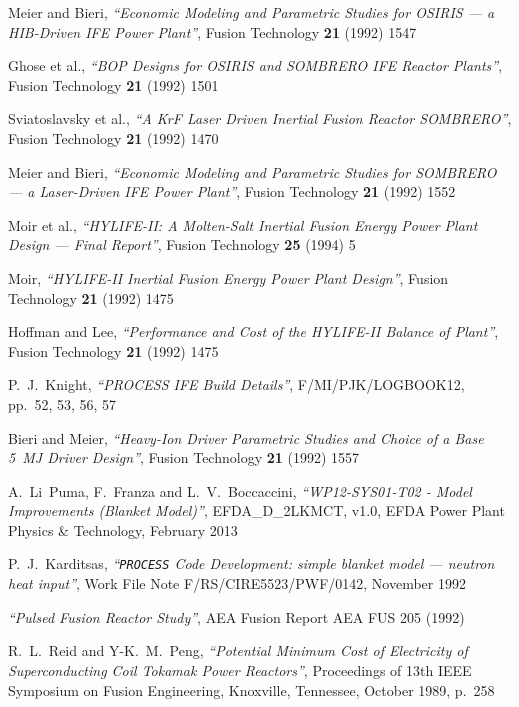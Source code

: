 \documentclass[11pt,a4paper]{report}
\newcommand{\process}{\mbox{\texttt{PROCESS}}}
\begin{document}
\begin{thebibliography}{99}
Meier and Bieri,
\textit{``Economic Modeling and Parametric Studies for OSIRIS --- a HIB-Driven
  IFE Power Plant''},
Fusion Technology \textbf{21} (1992) 1547

Ghose et al.,
\textit{``BOP Designs for OSIRIS and SOMBRERO IFE Reactor Plants''},
Fusion Technology \textbf{21} (1992) 1501

Sviatoslavsky et al.,
\textit{``A KrF Laser Driven Inertial Fusion Reactor SOMBRERO''},
Fusion Technology \textbf{21} (1992) 1470

Meier and Bieri,
\textit{``Economic Modeling and Parametric Studies for SOMBRERO --- a Laser-Driven
  IFE Power Plant''},
Fusion Technology \textbf{21} (1992) 1552

Moir et al.,
\textit{``HYLIFE-II: A Molten-Salt Inertial Fusion Energy Power Plant Design
  --- Final Report''},
Fusion Technology \textbf{25} (1994) 5

Moir,
\textit{``HYLIFE-II Inertial Fusion Energy Power Plant Design''},
Fusion Technology \textbf{21} (1992) 1475

Hoffman and Lee,
\textit{``Performance and Cost of the HYLIFE-II Balance of Plant''},
Fusion Technology \textbf{21} (1992) 1475

P.\ J.\ Knight,
\textit{``PROCESS IFE Build Details''},
F/MI/PJK/LOGBOOK12, pp.\ 52, 53, 56, 57

Bieri and Meier,
\textit{``Heavy-Ion Driver Parametric Studies and Choice of a Base 5~MJ Driver
  Design''},
Fusion Technology \textbf{21} (1992) 1557

A.\ Li~Puma, F.\ Franza and L.\ V.\ Boccaccini, \textit{``WP12-SYS01-T02 -
  Model Improvements (Blanket Model)''},
EFDA\_D\_2LKMCT, v1.0, EFDA Power Plant Physics \& Technology, February 2013

P.\ J.\ Karditsas, \textit{``\process\/ Code Development: simple blanket model ---
neutron heat input''},
Work File Note F/RS/CIRE5523/PWF/0142, November 1992

\textit{``Pulsed Fusion Reactor Study''},
AEA Fusion Report AEA FUS 205
(1992)

R.\ L.\ Reid and Y-K.\ M.\ Peng,
\textit{``Potential Minimum Cost of Electricity of Superconducting Coil
Tokamak Power Reactors''},
Proceedings of 13th IEEE Symposium on Fusion Engineering, Knoxville,
Tennessee, October 1989, p.\ 258


\end{thebibliography}
\end{document}
